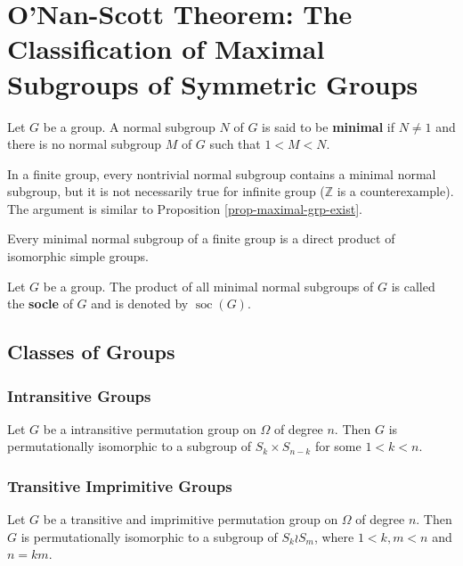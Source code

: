 \section{O'Nan-Scott Theorem: The Classification of Maximal Subgroups of Symmetric Groups}
\begin{definition}
	Let $G$ be a group. A normal subgroup $N$ of $G$ is said to be \textbf{minimal} if $N\neq 1$ and there is no normal subgroup $M$ of $G$ such that $1<M< N$.
\end{definition}
\begin{remark}
	In a  finite group, every nontrivial normal subgroup contains a minimal normal subgroup, but it is not necessarily true for infinite group ($\mathbb{Z}$ is a counterexample). The argument is similar to Proposition \ref{prop-maximal-grp-exist}.
\end{remark}
\begin{proposition} 
	Every minimal normal subgroup of a finite group is a direct product of isomorphic simple groups.
\end{proposition}

\begin{definition}
	Let $G$ be a group. The product of all minimal normal subgroups of $G$ is called the \textbf{socle} of $G$ and is denoted by $\operatorname{soc}(G)$.
\end{definition}
\subsection{Classes of Groups} \label{sec-classes-of-grps}
\subsubsection{Intransitive Groups}
\begin{proposition}
	Let $G$ be a intransitive permutation group on $\Omega$ of degree $n$. Then $G$ is permutationally isomorphic to a subgroup of $S_k\times S_{n-k}$ for some $1<k< n$.
\end{proposition}
\subsubsection{Transitive Imprimitive Groups}
\begin{proposition}
	Let $G$ be a transitive and imprimitive permutation group on $\Omega$ of degree $n$. Then $G$ is permutationally isomorphic to a subgroup of $S_k \wr S_m$, where $1<k,m<n$ and $n = km$.
\end{proposition}


